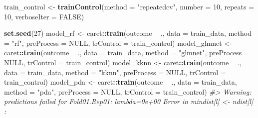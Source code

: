\documentclass[]{book}
\newenvironment{Shaded}{\begin{snugshade}}{\end{snugshade}}
\newcommand{\CommentTok}[1]{\textcolor[rgb]{0.56,0.35,0.01}{\textit{#1}}}
\newcommand{\DataTypeTok}[1]{\textcolor[rgb]{0.13,0.29,0.53}{#1}}
\newcommand{\DecValTok}[1]{\textcolor[rgb]{0.00,0.00,0.81}{#1}}
\newcommand{\KeywordTok}[1]{\textcolor[rgb]{0.13,0.29,0.53}{\textbf{#1}}}
\newcommand{\NormalTok}[1]{#1}
\newcommand{\OperatorTok}[1]{\textcolor[rgb]{0.81,0.36,0.00}{\textbf{#1}}}
\newcommand{\OtherTok}[1]{\textcolor[rgb]{0.56,0.35,0.01}{#1}}
\newcommand{\StringTok}[1]{\textcolor[rgb]{0.31,0.60,0.02}{#1}}
\begin{document}
\begin{Shaded}
\begin{Highlighting}[]

\NormalTok{train_control <-}\StringTok{ }\KeywordTok{trainControl}\NormalTok{(}\DataTypeTok{method =} \StringTok{"repeatedcv"}\NormalTok{, }
                              \DataTypeTok{number =} \DecValTok{10}\NormalTok{, }
                              \DataTypeTok{repeats =} \DecValTok{10}\NormalTok{, }
                              \DataTypeTok{verboseIter =} \OtherTok{FALSE}\NormalTok{)}

\KeywordTok{set.seed}\NormalTok{(}\DecValTok{27}\NormalTok{)}
\NormalTok{model_rf <-}\StringTok{ }\NormalTok{caret}\OperatorTok{::}\KeywordTok{train}\NormalTok{(outcome }\OperatorTok{~}\StringTok{ }\NormalTok{.,}
                             \DataTypeTok{data =}\NormalTok{ train_data,}
                             \DataTypeTok{method =} \StringTok{"rf"}\NormalTok{,}
                             \DataTypeTok{preProcess =} \OtherTok{NULL}\NormalTok{,}
                             \DataTypeTok{trControl =}\NormalTok{ train_control)}
\NormalTok{model_glmnet <-}\StringTok{ }\NormalTok{caret}\OperatorTok{::}\KeywordTok{train}\NormalTok{(outcome }\OperatorTok{~}\StringTok{ }\NormalTok{.,}
                             \DataTypeTok{data =}\NormalTok{ train_data,}
                             \DataTypeTok{method =} \StringTok{"glmnet"}\NormalTok{,}
                             \DataTypeTok{preProcess =} \OtherTok{NULL}\NormalTok{,}
                             \DataTypeTok{trControl =}\NormalTok{ train_control)}
\NormalTok{model_kknn <-}\StringTok{ }\NormalTok{caret}\OperatorTok{::}\KeywordTok{train}\NormalTok{(outcome }\OperatorTok{~}\StringTok{ }\NormalTok{.,}
                             \DataTypeTok{data =}\NormalTok{ train_data,}
                             \DataTypeTok{method =} \StringTok{"kknn"}\NormalTok{,}
                             \DataTypeTok{preProcess =} \OtherTok{NULL}\NormalTok{,}
                             \DataTypeTok{trControl =}\NormalTok{ train_control)}
\NormalTok{model_pda <-}\StringTok{ }\NormalTok{caret}\OperatorTok{::}\KeywordTok{train}\NormalTok{(outcome }\OperatorTok{~}\StringTok{ }\NormalTok{.,}
                             \DataTypeTok{data =}\NormalTok{ train_data,}
                             \DataTypeTok{method =} \StringTok{"pda"}\NormalTok{,}
                             \DataTypeTok{preProcess =} \OtherTok{NULL}\NormalTok{,}
                             \DataTypeTok{trControl =}\NormalTok{ train_control)}
\CommentTok{#> Warning: predictions failed for Fold01.Rep01: lambda=0e+00 Error in mindist[l] <- ndist[l] : }

\end{Highlighting}
\end{Shaded}
\end{document}
